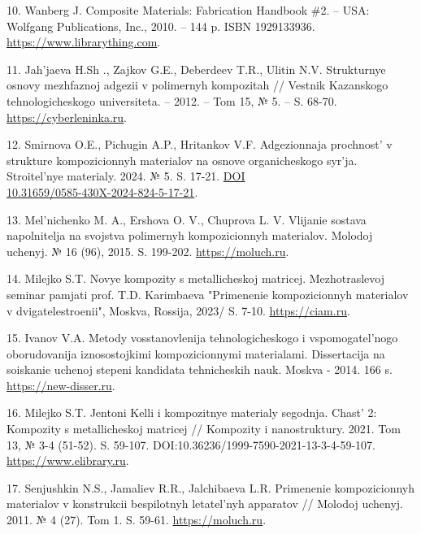 \begin{references}
10. Wanberg J. Composite Materials: Fabrication Handbook \#2. – USA:
Wolfgang Publications, Inc., 2010. – 144 p. ISBN
1929133936. \href{https://www.librarything.com/work/9709968}{https://www.librarything.com}.

11. Jah'jaeva H.Sh ., Zajkov G.E., Deberdeev T.R., Ulitin
N.V. Strukturnye osnovy mezhfaznoj adgezii v polimernyh kompozitah //
Vestnik Kazanskogo tehnologicheskogo universiteta. – 2012. – Tom 15, №
5. – S. 68-70.
\href{https://cyberleninka.ru/article/n/strukturnye-osnovy-mezhfaznoy-adgezii-nanoadgezii-v-polimernyh-kompozitah?ysclid=m6j2st57s6418214983}{https://cyberleninka.ru}. 

12. Smirnova O.E., Pichugin A.P., Hritankov V.F. Adgezionnaja
prochnost' v strukture kompozicionnyh materialov na osnove
organicheskogo syr'ja. Stroitel'nye materialy. 2024. №
5. S. 17-21. \href{https://doi.org/10.31659/0585-430X-2024-824-5-17-21}{DOI \\10.31659/0585-430X-2024-824-5-17-21}.

13. Mel'nichenko M. A., Ershova O. V., Chuprova L. V. Vlijanie sostava
napolnitelja na svojstva polimer\-nyh kompozicionnyh materialov. Molodoj
uchenyj. № 16 (96),
2015. S. 199-202. \href{https://moluch.ru/archive/96/21554/}{https://moluch.ru}.

14. Milejko S.T. Novye kompozity s metallicheskoj
matricej. Mezhotraslevoj seminar pamjati prof. T.D. Karimbaeva
"Primenenie kompozicionnyh materialov v dvigatelestroenii", Moskva,
Rossija, 2023/
S. 7-10. \href{https://ciam.ru/composites_theses/mileiko.pdf}{https://ciam.ru}.

15. Ivanov V.A. Metody vosstanovlenija tehnologicheskogo i
vspomogatel'nogo oborudovanija iznoso\-stojkimi kompozicionnymi
materialami. Dissertacija na soiskanie uchenoj stepeni kandidata
tehnicheskih nauk. Moskva - 2014. 166
s. \href{https://new-disser.ru/_avtoreferats/01007923651.pdf?ysclid=m6j2zfwyqg324913287}{https://new-disser.ru}.

16. Milejko S.T. Jentoni Kelli i kompozitnye materialy
segodnja. Chast' 2: Kompozity s metallicheskoj matricej // Kompozity i
nanostruktury. 2021. Tom 13, № 3-4
(51-52). S. 59-107. DOI:10.36236/1999-7590-2021-13-3-4-59-107. \href{https://www.elibrary.ru/item.asp?id=48118660&ysclid=m87loyv5gc289218394}{https://www.elibrary.ru}.

17. Senjushkin N.S., Jamaliev R.R., Jalchibaeva L.R. Primenenie
kompozicionnyh materialov v konstrukcii bespilotnyh letatel'nyh
apparatov // Molodoj uchenyj. 2011. № 4 (27). Tom
1. S. 59-61. \href{https://moluch.ru/archive/27/2963/?ysclid=m6j31n5ru1840809790}{https://moluch.ru}.


\end{references}

